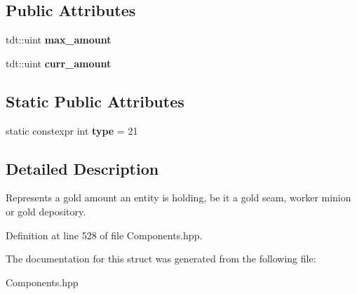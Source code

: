 \subsection*{Public Attributes}
\begin{DoxyCompactItemize}
\item 
tdt\+::uint {\bfseries max\+\_\+amount}\hypertarget{struct_gold_component_aea59b958529f948591caddcdbe2208f4}{}\label{struct_gold_component_aea59b958529f948591caddcdbe2208f4}

\item 
tdt\+::uint {\bfseries curr\+\_\+amount}\hypertarget{struct_gold_component_a5b753927743f4fd3736b462f57708439}{}\label{struct_gold_component_a5b753927743f4fd3736b462f57708439}

\end{DoxyCompactItemize}
\subsection*{Static Public Attributes}
\begin{DoxyCompactItemize}
\item 
static constexpr int {\bfseries type} = 21\hypertarget{struct_gold_component_ae3c2d173532fdef10129033d6a0d571e}{}\label{struct_gold_component_ae3c2d173532fdef10129033d6a0d571e}

\end{DoxyCompactItemize}


\subsection{Detailed Description}
Represents a gold amount an entity is holding, be it a gold seam, worker minion or gold depository. 

Definition at line 528 of file Components.\+hpp.



The documentation for this struct was generated from the following file\+:\begin{DoxyCompactItemize}
\item 
Components.\+hpp\end{DoxyCompactItemize}
